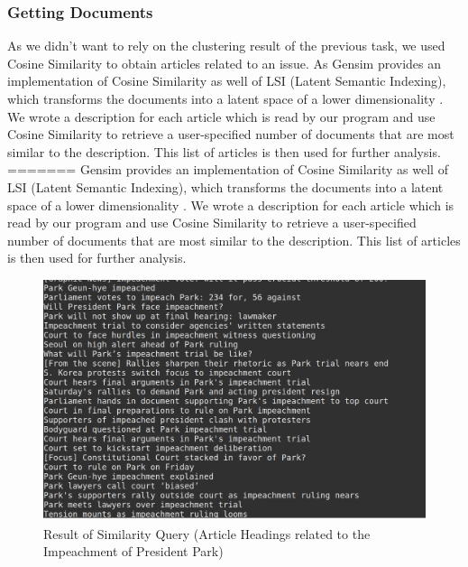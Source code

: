 \subsubsection{Getting Documents}
As we didn't want to rely on the clustering result of the previous task, we used Cosine Similarity to obtain articles related to an issue.
As Gensim provides an implementation of Cosine Similarity as well of LSI (Latent Semantic Indexing), which transforms the documents into a latent space of a lower dimensionality \parencite{gensim}.
We wrote a description for each article which is read by our program and use Cosine Similarity to retrieve a user-specified number of documents that are most similar to the description. This list of articles is then used for further analysis.
=======
Gensim provides an implementation of Cosine Similarity as well of LSI (Latent Semantic Indexing), which transforms the documents into a latent space of a lower dimensionality \parencite{gensim}.
We wrote a description for each article which is read by our program and use Cosine Similarity to retrieve a user-specified number of documents that are most similar to the description. This list of articles is then used for further analysis.
\begin{figure}[h]
\centering
\includegraphics[scale= 0.2]{similarity.png}
\caption{Result of Similarity Query (Article Headings related to the Impeachment of President Park)}
\end{figure}

